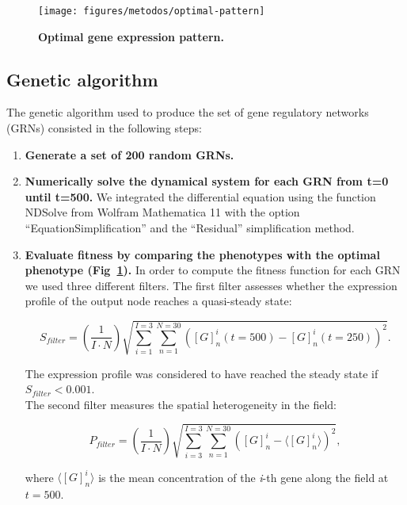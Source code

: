 \documentclass[10pt,letterpaper]{article}
\begin{document}
\begin{figure}[!h]
 \texttt{[image: figures/metodos/optimal-pattern]}
 \caption{\bf Optimal gene expression pattern.}
 \label{fig:exp-pattern}
\end{figure}

\subsection*{Genetic algorithm}

The genetic algorithm used to produce the set of gene regulatory networks (GRNs)
consisted in the following steps:

\begin{enumerate}
 \item{\bf Generate a set of 200 random GRNs.}
 
 \item{\bf Numerically solve the dynamical system for each GRN from t=0 until 
 t=500.} We integrated the differential equation using the function NDSolve from
 Wolfram Mathematica 11 with the option “EquationSimplification” and the 
 “Residual” simplification method.
 
 \item{\bf Evaluate fitness by comparing the phenotypes with the optimal 
 phenotype (Fig~\ref{fig:exp-pattern}).} In order to compute the fitness 
 function for each GRN we used three different filters. The first filter 
 assesses whether the expression profile of the output node reaches a 
 quasi-steady state:
 
 \begin{equation}
  S_{filter} = \left( \frac{1}{I \cdot N}\right) \sqrt{\sum_{i=1}^{I=3}
  \sum_{n=1}^{N=30} ([G]_n^i(t=500) - [G]^i_n(t=250))^2}.
 \end{equation}
 
 The expression profile was considered to have reached the steady state if 
 $S_{filter} < 0.001$.\\
 
 The second filter measures the spatial heterogeneity in the field:
 
 \begin{equation}
  P_{filter} = \left( \frac{1}{I \cdot N} \right) \sqrt{ \sum_{i=3}^{I=3}
  \sum_{n=1}^{N=30} \left( [G]^i_n - \langle [G]^i_n \rangle \right)^2 },
 \end{equation}
 
 where $\langle [G]^i_n \rangle$ is the mean concentration of the \emph{i}-th 
 gene along the field at $t=500$.\\
 

\end{enumerate}
\end{document}
